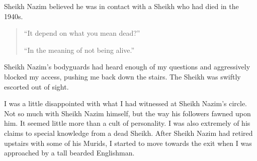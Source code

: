 \documentclass[12pt]{memoir}
\begin{document}
Sheikh Nazim believed he was in contact with a Sheikh
who had died in the 1940s.

\begin{quote}
“It depend on what you mean dead?”

“In the meaning of not being alive.”
\end{quote}

Sheikh Nazim’s bodyguards had heard enough of my questions
and aggressively blocked my access, pushing me back down the stairs.
The Sheikh was swiftly escorted out of sight.

I was a little disappointed
with what I had witnessed at Sheikh Nazim’s circle.
Not so much with Sheikh Nazim himself,
but the way his followers fawned upon him.
It seemed little more than a cult of personality.
I was also extremely  of his claims
to special knowledge from a dead Sheikh.
After Sheikh Nazim had retired upstairs with some of his Murids,
I started to move towards the exit
when I was approached by a tall bearded Englishman.
\end{document}
